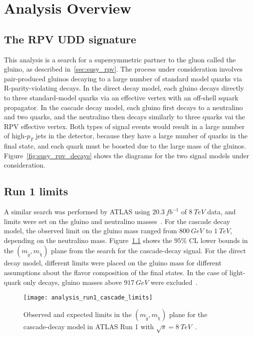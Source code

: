 \chapter{Analysis Overview}\label{ch:analysis_overview}

\section{The RPV UDD signature}\label{sec:signal_of_interest}

This analysis is a search for a supersymmetric partner to the gluon called the gluino, as described in~\ref{sec:susy_rpv}.
The process under consideration involves pair-produced gluinos decaying to a large number of standard model quarks via R-parity-violating decays.
In the direct decay model, each gluino decays directly to three standard-model quarks via an effective vertex with an off-shell squark propagator.
In the cascade decay model, each gluino first decays to a neutralino and two quarks, and the neutralino then decays similarly to three quarks vai the RPV effective vertex.
Both types of signal events would result in a large number of high-$p_{T}$ jets in the detector, because they have a large number of quarks in the final state, and each quark must be boosted due to the large mass of the gluinos.
Figure~\ref{fig:susy_rpv_decays} shows the diagrams for the two signal models under consideration.

\section{Run 1 limits}\label{sec:run1_limits}

A similar search was performed by ATLAS using $20.3~fb^{-1}$ of $8~TeV$ data, and limits were set on the gluino and neutralino masses~\cite{run1-multijet}.
For the cascade decay model, the observed limit on the gluino mass ranged from $800~GeV$ to $1~TeV$, depending on the neutralino mass.
Figure~\ref{fig:run1_cascade_limits} shows the $95\%$ CL lower bounds in the $(m_{\tilde{g}}, m_{\tilde{\chi}})$ plane from the search for the cascade-decay signal.
For the direct decay model, different limits were placed on the gluino mass for different assumptions about the flavor composition of the final states.
In the case of light-quark only decays, gluino masses above $917~GeV$ were excluded~\cite{run1-multijet}.

\begin{figure}[!ht]\centering
    \texttt{[image: analysis\_run1\_cascade\_limits]}
    \caption{Observed and expected limits in the $(m_{\tilde{g}}, m_{\tilde{\chi}})$ plane for the cascade-decay model in ATLAS Run 1 with $\sqrt{s}=8~TeV$~\cite{run1-multijet}.
    }
    \label{fig:run1_cascade_limits}
\end{figure}

